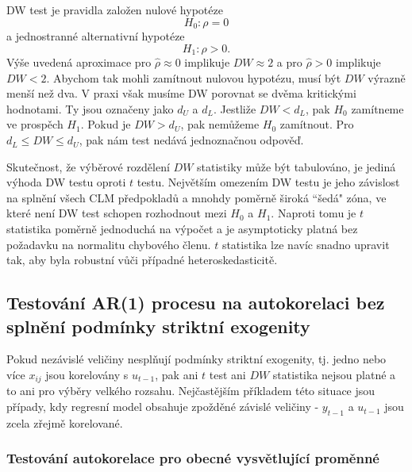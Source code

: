 DW test je pravidla založen nulové hypotéze
\begin{equation}
H_0: \rho = 0
\end{equation}
a jednostranné alternativní hypotéze
\begin{equation}
H_1: \rho > 0.
\end{equation}
Výše uvedená aproximace pro $\hat{\rho} \approx 0$ implikuje $DW \approx 2$ a pro $\hat{\rho} > 0$ implikuje $DW < 2$. Abychom tak mohli zamítnout nulovou hypotézu, musí být $DW$ výrazně menší než dva. V praxi však musíme DW porovnat se dvěma kritickými hodnotami. Ty jsou označeny jako $d_U$ a $d_L$. Jestliže $DW < d_L$, pak $H_0$ zamítneme ve prospěch $H_1$. Pokud je $DW > d_U$, pak nemůžeme $H_0$ zamítnout. Pro $d_L \le DW \le d_U$, pak nám test nedává jednoznačnou odpověď.

Skutečnost, že výběrové rozdělení $DW$ statistiky může být tabulováno, je jediná výhoda DW testu oproti $t$ testu. Největším omezením DW testu je jeho závislost na splnění všech CLM předpokladů a mnohdy poměrně široká ``šedá" zóna, ve které není DW test schopen rozhodnout mezi $H_0$ a $H_1$. Naproti tomu je $t$ statistika poměrně jednoduchá na výpočet a je asymptoticky platná bez požadavku na normalitu chybového členu. $t$ statistika lze navíc snadno upravit tak, aby byla robustní vůči případné heteroskedasticitě.

\subsection{Testování AR(1) procesu na autokorelaci bez splnění podmínky striktní exogenity}

Pokud nezávislé veličiny nesplňují podmínky striktní exogenity, tj. jedno nebo více $x_{ij}$ jsou korelovány s $u_{t - 1}$, pak ani $t$ test ani $DW$ statistika nejsou platné a to ani pro výběry velkého rozsahu. Nejčastějším příkladem této situace jsou případy, kdy regresní model obsahuje zpožděné závislé veličiny - $y_{t - 1}$ a $u_{t - 1}$ jsou zcela zřejmě korelované.

\subsubsection{Testování autokorelace pro obecné vysvětlující proměnné}

